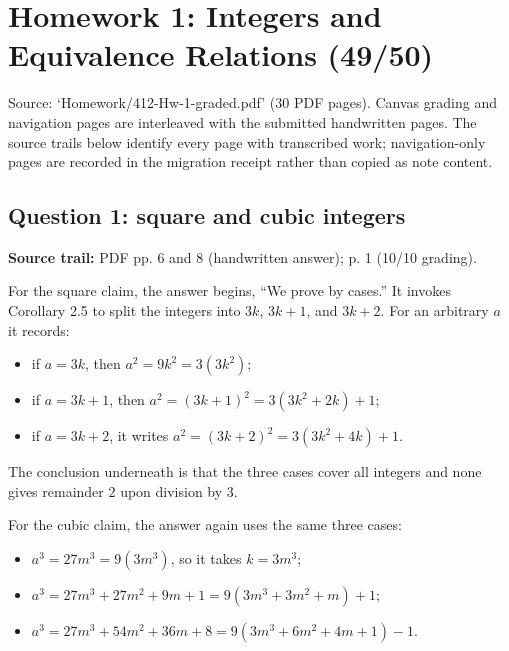 \chapter{Homework 1: Integers and Equivalence Relations (49/50)}\label{homework-01}

Source: `Homework/412-Hw-1-graded.pdf' (30 PDF pages). Canvas grading and navigation pages are interleaved with the submitted handwritten pages. The source trails below identify every page with transcribed work; navigation-only pages are recorded in the migration receipt rather than copied as note content.

\section{Question 1: square and cubic integers}

\textbf{Source trail:} PDF pp. 6 and 8 (handwritten answer); p. 1 (10/10 grading).

For the square claim, the answer begins, ``We prove by cases.'' It invokes Corollary 2.5 to split the integers into \(3k\), \(3k + 1\), and \(3k + 2\). For an arbitrary \(a\) it records:

\begin{itemize}
\tightlist
\item
  if \(a = 3k\), then \(a^{2} = 9k^{2} = 3\left( {3k^{2}} \right)\);
\item
  if \(a = 3k + 1\), then \(a^{2} = \left( {3k + 1} \right)^{2} = 3\left( {3k^{2} + 2k} \right) + 1\);
\item
  if \(a = 3k + 2\), it writes \(a^{2} = \left( {3k + 2} \right)^{2} = 3\left( {3k^{2} + 4k} \right) + 1\).
\end{itemize}

The conclusion underneath is that the three cases cover all integers and none gives remainder \(2\) upon division by \(3\).

For the cubic claim, the answer again uses the same three cases:

\begin{itemize}
\tightlist
\item
  \(a^{3} = 27m^{3} = 9\left( {3m^{3}} \right)\), so it takes \(k = 3m^{3}\);
\item
  \(a^{3} = 27m^{3} + 27m^{2} + 9m + 1 = 9\left( {3m^{3} + 3m^{2} + m} \right) + 1\);
\item
  \(a^{3} = 27m^{3} + 54m^{2} + 36m + 8 = 9\left( {3m^{3} + 6m^{2} + 4m + 1} \right) - 1\).
\end{itemize}

